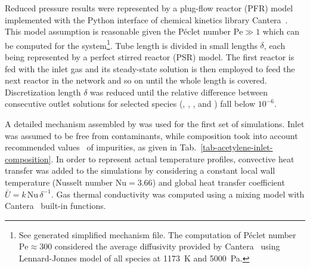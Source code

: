 \documentclass[final,3p,times,twocolumn,sort&compress]{elsarticle}
\begin{document}
Reduced pressure results were represented by a plug-flow reactor (PFR) model implemented with the Python interface of chemical kinetics library Cantera~\cite{Cantera2014}. This model assumption is reasonable given the  Péclet number $\mathrm{Pe}\gg{}1$ which can be computed for the system\footnote{See generated simplified mechanism file. The computation of Péclet number $\mathrm{Pe}\approx{}300$ considered the average diffusivity \textendash{} provided by Cantera~\cite{Cantera2014} using Lennard-Jonnes model \textendash{} of all species at \SI{1173}{\kelvin} and \SI{5000}{\pascal}.}. Tube length is divided in small lengths $\delta$, each being represented by a perfect stirred reactor (PSR) model. The first reactor is fed with the inlet gas and its steady-state solution is then employed to feed the next reactor in the network and so on until the whole length is covered. Discretization length $\delta$ was reduced until the relative difference between consecutive outlet solutions for selected species (, , ,  and ) fall below $10^{-6}$. 

A detailed mechanism assembled by \citet{Norinaga2009} was used for the first set of simulations. Inlet  was assumed to be free from contaminants, while  composition took into account recommended values~\cite{Norinaga2007} of impurities, as given in Tab.~\ref{tab-acetylene-inlet-composition}. In order to represent actual temperature profiles, convective heat transfer was added to the simulations by considering a constant local wall temperature (Nusselt number $\mathrm{Nu}=3.66$) and global heat transfer coefficient $\bar{U}=k\,\mathrm{Nu}\,\delta^{-1}$. Gas thermal conductivity was computed using a mixing model with Cantera~\cite{Cantera2014} built-in functions.

\begin{table}[h]
	\caption{\label{tab-acetylene-inlet-composition}Inlet acetylene gas composition given in mole fractions adopted for simulations. Nitrogen carrier is assumed free of impurities and its proportion in the mixture is identical to the experimental conditions.}
	
\end{table}
\end{document}
